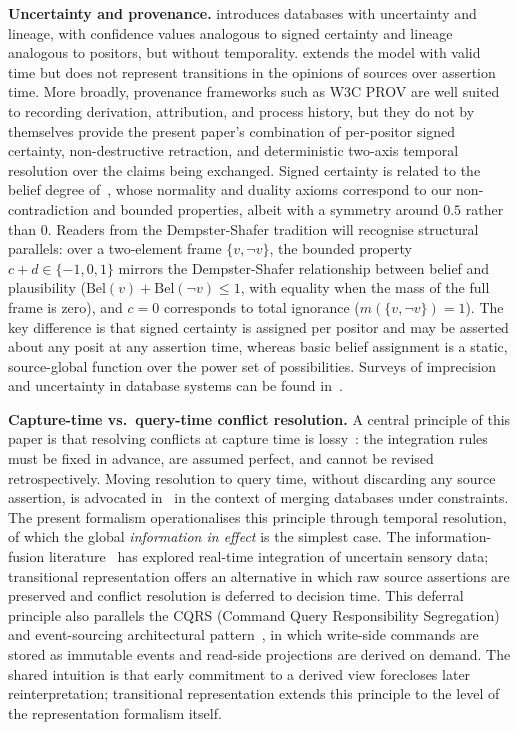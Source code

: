 \documentclass[a4paper,fleqn]{cas-sc}
\begin{document}
\textbf{Uncertainty and provenance.}
\cite{BenjellounEtAl} introduces databases with uncertainty and lineage, with confidence values analogous to signed certainty and lineage analogous to positors, but without temporality. \cite{DyllaEtAl} extends the model with valid time but does not represent transitions in the opinions of sources over assertion time. More broadly, provenance frameworks such as W3C PROV are well suited to recording derivation, attribution, and process history, but they do not by themselves provide the present paper's combination of per-positor signed certainty, non-destructive retraction, and deterministic two-axis temporal resolution over the claims being exchanged. Signed certainty is related to the belief degree of~\cite{Liu}, whose normality and duality axioms correspond to our non-contradiction and bounded properties, albeit with a symmetry around $0.5$ rather than $0$. Readers from the Dempster-Shafer tradition will recognise structural parallels: over a two-element frame $\{v, \neg v\}$, the bounded property $c + d \in \{-1, 0, 1\}$ mirrors the Dempster-Shafer relationship between belief and plausibility ($\mathrm{Bel}(v) + \mathrm{Bel}(\neg v) \leq 1$, with equality when the mass of the full frame is zero), and $c = 0$ corresponds to total ignorance ($m(\{v, \neg v\}) = 1$). The key difference is that signed certainty is assigned per positor and may be asserted about any posit at any assertion time, whereas basic belief assignment is a static, source-global function over the power set of possibilities. Surveys of imprecision and uncertainty in database systems can be found in~\cite{Smets,Motro}.

\textbf{Capture-time vs.\ query-time conflict resolution.}
A central principle of this paper is that resolving conflicts at capture time is lossy~\cite{MassaroEtAl}: the integration rules must be fixed in advance, are assumed perfect, and cannot be revised retrospectively. Moving resolution to query time, without discarding any source assertion, is advocated in~\cite{LinEtAl} in the context of merging databases under constraints. The present formalism operationalises this principle through temporal resolution, of which the global \emph{information in effect} is the simplest case. The information-fusion literature~\cite{SmetsEtAl,LiuEtAl} has explored real-time integration of uncertain sensory data; transitional representation offers an alternative in which raw source assertions are preserved and conflict resolution is deferred to decision time. This deferral principle also parallels the CQRS (Command Query Responsibility Segregation) and event-sourcing architectural pattern~\cite{Fowler2011}, in which write-side commands are stored as immutable events and read-side projections are derived on demand. The shared intuition is that early commitment to a derived view forecloses later reinterpretation; transitional representation extends this principle to the level of the representation formalism itself.
\end{document}
